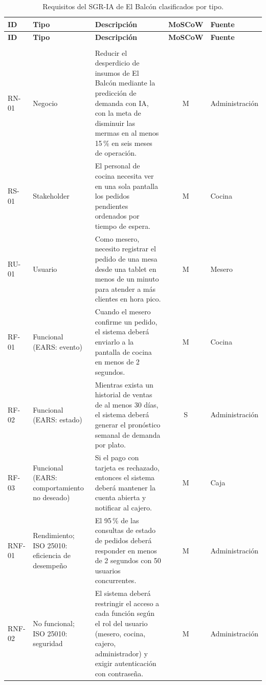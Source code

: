 \begin{longtable}{@{}>{\raggedright\arraybackslash}p{1.35cm}>{\raggedright\arraybackslash}p{2.7cm}>{\raggedright\arraybackslash}p{6.3cm}c>{\raggedright\arraybackslash}p{2.2cm}@{}}
\caption{Requisitos del SGR-IA de El Balc\'on clasificados por tipo.}\label{tab:requisitos}\\
\toprule
\textbf{ID} & \textbf{Tipo} & \textbf{Descripci\'on} & \textbf{MoSCoW} & \textbf{Fuente} \\
\midrule
\endfirsthead
\toprule
\textbf{ID} & \textbf{Tipo} & \textbf{Descripci\'on} & \textbf{MoSCoW} & \textbf{Fuente} \\
\midrule
\endhead
\midrule
\multicolumn{5}{r}{\emph{contin\'ua en la p\'agina siguiente}}\\
\endfoot
\bottomrule
\endlastfoot
RN-01 & Negocio & Reducir el desperdicio de insumos de El Balc\'on mediante la predicci\'on de demanda con IA, con la meta de disminuir las mermas en al menos 15\,\% en seis meses de operaci\'on. & M & Administraci\'on \\
RS-01 & Stakeholder & El personal de cocina necesita ver en una sola pantalla los pedidos pendientes ordenados por tiempo de espera. & M & Cocina \\
RU-01 & Usuario & Como mesero, necesito registrar el pedido de una mesa desde una tablet en menos de un minuto para atender a m\'as clientes en hora pico. & M & Mesero \\
RF-01 & Funcional (EARS: evento) & Cuando el mesero confirme un pedido, el sistema deber\'a enviarlo a la pantalla de cocina en menos de 2 segundos. & M & Cocina \\
RF-02 & Funcional (EARS: estado) & Mientras exista un historial de ventas de al menos 30 d\'ias, el sistema deber\'a generar el pron\'ostico semanal de demanda por plato. & S & Administraci\'on \\
RF-03 & Funcional (EARS: comportamiento no deseado) & Si el pago con tarjeta es rechazado, entonces el sistema deber\'a mantener la cuenta abierta y notificar al cajero. & M & Caja \\
RNF-01 & Rendimiento; ISO 25010: eficiencia de desempe\~no & El 95\,\% de las consultas de estado de pedidos deber\'a responder en menos de 2 segundos con 50 usuarios concurrentes. & M & Administraci\'on \\
RNF-02 & No funcional; ISO 25010: seguridad & El sistema deber\'a restringir el acceso a cada funci\'on seg\'un el rol del usuario (mesero, cocina, cajero, administrador) y exigir autenticaci\'on con contrase\~na. & M & Administraci\'on \\

\end{longtable}
